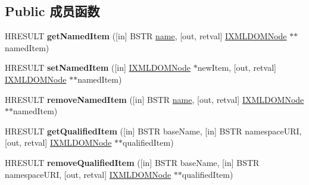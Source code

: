 \subsection*{Public 成员函数}
\begin{DoxyCompactItemize}
\item 
\mbox{\label{interface_i_x_m_l_d_o_m_named_node_map_a79db3cb4c722dc55339a05982823dd29}} 
H\+R\+E\+S\+U\+LT {\bfseries get\+Named\+Item} (\mbox{[}in\mbox{]} B\+S\+TR \hyperlink{structname}{name}, \mbox{[}out, retval\mbox{]} \hyperlink{interface_i_x_m_l_d_o_m_node}{I\+X\+M\+L\+D\+O\+M\+Node} $\ast$$\ast$named\+Item)
\item 
\mbox{\label{interface_i_x_m_l_d_o_m_named_node_map_a8309af1c2e48226b657da359299a349c}} 
H\+R\+E\+S\+U\+LT {\bfseries set\+Named\+Item} (\mbox{[}in\mbox{]} \hyperlink{interface_i_x_m_l_d_o_m_node}{I\+X\+M\+L\+D\+O\+M\+Node} $\ast$new\+Item, \mbox{[}out, retval\mbox{]} \hyperlink{interface_i_x_m_l_d_o_m_node}{I\+X\+M\+L\+D\+O\+M\+Node} $\ast$$\ast$named\+Item)
\item 
\mbox{\label{interface_i_x_m_l_d_o_m_named_node_map_a9f749404fefa78d7dad12eaf9280c0d6}} 
H\+R\+E\+S\+U\+LT {\bfseries remove\+Named\+Item} (\mbox{[}in\mbox{]} B\+S\+TR \hyperlink{structname}{name}, \mbox{[}out, retval\mbox{]} \hyperlink{interface_i_x_m_l_d_o_m_node}{I\+X\+M\+L\+D\+O\+M\+Node} $\ast$$\ast$named\+Item)
\item 
\mbox{\label{interface_i_x_m_l_d_o_m_named_node_map_a2e82f50e9f8ebcc17c8e6b805798a534}} 
H\+R\+E\+S\+U\+LT {\bfseries get\+Qualified\+Item} (\mbox{[}in\mbox{]} B\+S\+TR base\+Name, \mbox{[}in\mbox{]} B\+S\+TR namespace\+U\+RI, \mbox{[}out, retval\mbox{]} \hyperlink{interface_i_x_m_l_d_o_m_node}{I\+X\+M\+L\+D\+O\+M\+Node} $\ast$$\ast$qualified\+Item)
\item 
\mbox{\label{interface_i_x_m_l_d_o_m_named_node_map_aa36601c27b5275ea075bae4c53cbed58}} 
H\+R\+E\+S\+U\+LT {\bfseries remove\+Qualified\+Item} (\mbox{[}in\mbox{]} B\+S\+TR base\+Name, \mbox{[}in\mbox{]} B\+S\+TR namespace\+U\+RI, \mbox{[}out, retval\mbox{]} \hyperlink{interface_i_x_m_l_d_o_m_node}{I\+X\+M\+L\+D\+O\+M\+Node} $\ast$$\ast$qualified\+Item)
$$
\end{DoxyCompactItemize}
